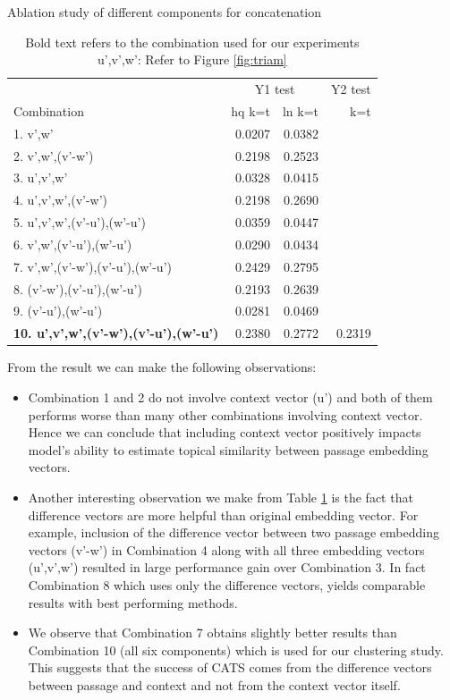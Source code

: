 \documentclass[sigconf,authordraft]{acmart}
\begin{document}
\begin{table}[t]
\centering
\caption{Ablation study of different components for concatenation}
\label{tab:abl}
\begin{tabular}{@{}lrrr@{}}\toprule
& \multicolumn{2}{c}{Y1 test} & Y2 test  \\
\cmidrule(r){2-3}
\cmidrule(r){4-4}
Combination & hq k=t & ln k=t & k=t \\\midrule
1. v',w' & 0.0207 & 0.0382 &  \\ 
2. v',w',(v'-w') & 0.2198 & 0.2523 & \\
3. u',v',w' & 0.0328 & 0.0415 & \\
4. u',v',w',(v'-w') & 0.2198 & 0.2690 & \\
5. u',v',w',(v'-u'),(w'-u') & 0.0359 & 0.0447 & \\
6. v',w',(v'-u'),(w'-u') & 0.0290 & 0.0434 & \\
7. v',w',(v'-w'),(v'-u'),(w'-u') & 0.2429 & 0.2795 & \\
8. (v'-w'),(v'-u'),(w'-u') & 0.2193 & 0.2639 & \\
9. (v'-u'),(w'-u') & 0.0281 & 0.0469 & \\
\textbf{10. u',v',w',(v'-w'),(v'-u'),(w'-u')} & 0.2380 & 0.2772 & 0.2319 \\
\bottomrule
\end{tabular}
\caption*{Bold text refers to the combination used for our experiments \\
u',v',w': Refer to Figure \ref{fig:triam}}
\end{table}

From the result we can make the following observations:
\begin{itemize}
    \item Combination 1 and 2 do not involve context vector (u') and both of them performs worse than many other combinations involving context vector. Hence we can conclude that including context vector positively impacts model's ability to estimate topical similarity between passage embedding vectors.
    \item Another interesting observation we make from Table \ref{tab:abl} is the fact that difference vectors are more helpful than original embedding vector. For example, inclusion of the difference vector between two passage embedding vectors (v'-w') in Combination 4 along with all three embedding vectors (u',v',w') resulted in large performance gain over Combination 3. In fact Combination 8 which uses only the difference vectors, yields comparable results with best performing methods.
    \item We observe that Combination 7 obtains slightly better results than Combination 10 (all six components) which is used for our clustering study. This suggests that the success of CATS comes from the difference vectors between passage and context and not from the context vector itself. 
\end{itemize}
\end{document}
